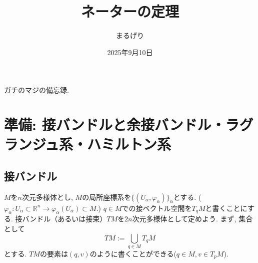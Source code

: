\documentclass[a4paper]{ujarticle}
\title{ネーターの定理}
\numberwithin{equation}{section}
\theoremstyle{definition}
\begin{document}
\date{2025年9月10日}
\author{まるげり}
\setcounter{section}{-1}
\maketitle
    ガチのマジの備忘録.

    \section{準備: 接バンドルと余接バンドル・ラグランジュ系・ハミルトン系}
        \subsection{接バンドル}
        $M$を$n$次元多様体とし, $M$の局所座標系を$\{(U_{\alpha}, \varphi_{\alpha})\}_{\alpha}$とする.
        ($\varphi_{\alpha} : U_{\alpha} \subset \mathbb{R}^n \rightarrow \varphi_{\alpha}(U_{\alpha}) \subset M$.)
        $q \in M$での接ベクトル空間を$T_q M$と書くことにする.
        接バンドル（あるいは接束）$TM$を$2n$次元多様体として定めよう. 
        まず, 集合として
        \[
            TM := \bigcup_{q \in M} T_{q} M
        \]
        とする. $TM$の要素は$(q, v)$のように書くことができる($q \in M, v \in T_p M$). 
\end{document}
